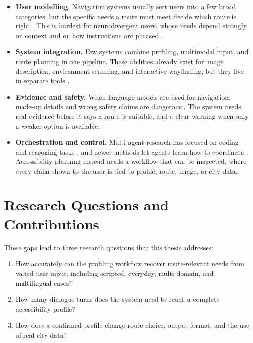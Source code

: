 \documentclass[../CLthesis.tex]{subfiles}
\begin{document}
\begin{itemize}
  \item \textbf{User modelling.}
  Navigation systems usually sort users into a few broad categories, but the specific needs a route must meet decide which route is right \citep{wobbrock2011ability}. This is hardest for neurodivergent users, whose needs depend strongly on context and on how instructions are phrased \citep{piedade2025neuroqueer}.

  \item \textbf{System integration.}
  Few systems combine profiling, multimodal input, and route planning in one pipeline. These abilities already exist for image description, environment scanning, and interactive wayfinding, but they live in separate tools \citep{huang2025accessibilityscout, gleason2020making}.

  \item \textbf{Evidence and safety.}
  When language models are used for navigation, made-up details and wrong safety claims are dangerous \citep{macleod2017understanding, ayanzadeh2025floorplan}. The system needs real evidence before it says a route is suitable, and a clear warning when only a weaker option is available.

  \item \textbf{Orchestration and control.}
  Multi-agent research has focused on coding and reasoning tasks \citep{wu2023autogen, hong2023metagpt}, and newer methods let agents learn how to coordinate \citep{zhang2024gdesigner, jiang2026agentqmix}. Accessibility planning instead needs a workflow that can be inspected, where every claim shown to the user is tied to profile, route, image, or city data.
\end{itemize}

\section{Research Questions and Contributions}
\label{sec:research-questions-contributions}
These gaps lead to three research questions that this thesis addresses:

\begin{enumerate}

\item How accurately can the profiling workflow recover route-relevant needs from varied user input, including scripted, everyday, multi-domain, and multilingual cases?
\item How many dialogue turns does the system need to reach a complete accessibility profile?
\item How does a confirmed profile change route choice, output format, and the use of real city data?

\end{enumerate}
\end{document}

